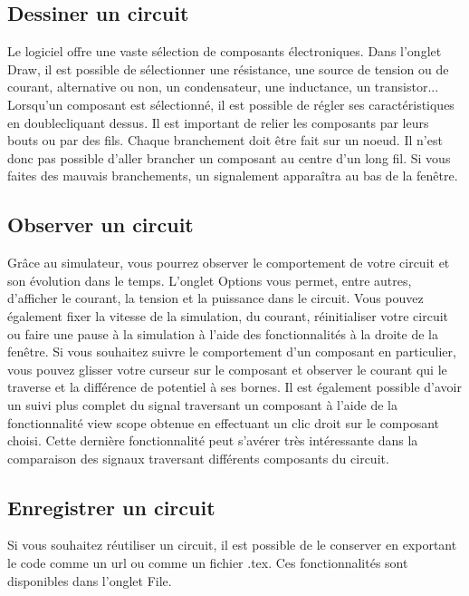 \documentclass[12pt,oneside,letterpaper]{article}
\begin{document}
\subsection{Dessiner un circuit}

Le logiciel offre une vaste sélection de composants électroniques. Dans l’onglet
Draw, il est possible de sélectionner une résistance, une source de tension ou de courant,
alternative ou non, un condensateur, une inductance, un transistor... Lorsqu’un
composant est sélectionné, il est possible de régler ses caractéristiques en doublecliquant
dessus. Il est important de relier les composants par leurs bouts ou par
des fils. Chaque branchement doit être fait sur un noeud. Il n’est donc pas possible
d’aller brancher un composant au centre d’un long fil. Si vous faites des mauvais
branchements, un signalement apparaîtra au bas de la fenêtre.



\subsection{Observer un circuit}

Grâce au simulateur, vous pourrez observer le comportement de votre circuit et
son évolution dans le temps. L’onglet Options vous permet, entre autres, d’afficher
le courant, la tension et la puissance dans le circuit. Vous pouvez également fixer la
vitesse de la simulation, du courant, réinitialiser votre circuit ou faire une pause à la
simulation à l’aide des fonctionnalités à la droite de la fenêtre. Si vous souhaitez suivre
le comportement d’un composant en particulier, vous pouvez glisser votre curseur sur
le composant et observer le courant qui le traverse et la différence de potentiel à ses
bornes. Il est également possible d’avoir un suivi plus complet du signal traversant un
composant à l’aide de la fonctionnalité view scope obtenue en effectuant un clic droit
sur le composant choisi. Cette dernière fonctionnalité peut s’avérer très intéressante
dans la comparaison des signaux traversant différents composants du circuit.


\subsection{Enregistrer un circuit}

Si vous souhaitez réutiliser un circuit, il est possible de le conserver en exportant
le code comme un url ou comme un fichier .tex. Ces fonctionnalités sont disponibles
dans l’onglet File.
\end{document}
